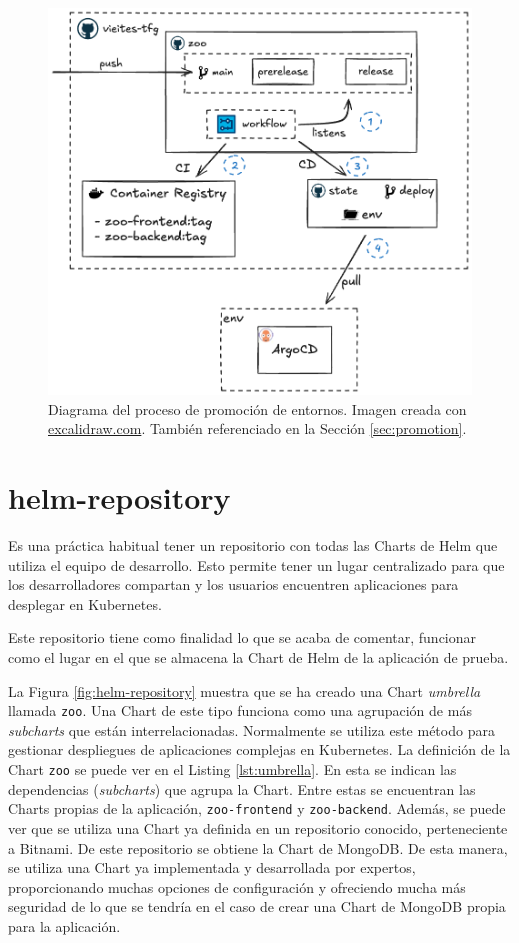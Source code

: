 \begin{figure}[h]
  \centerline{\includegraphics[width=13cm]{figuras/promotion}}
  \caption{Diagrama del proceso de promoción de entornos. Imagen creada con \href{https://excalidraw.com}{excalidraw.com}. También referenciado en la Sección \ref{sec:promotion}.}
  \label{fig:promotion}
\end{figure}


\section{helm-repository}
\label{subsec:helm}

Es una práctica habitual tener un repositorio con todas las Charts de Helm que utiliza el equipo de desarrollo. Esto permite tener un lugar centralizado para que los desarrolladores compartan y los usuarios encuentren aplicaciones para desplegar en Kubernetes.

Este repositorio tiene como finalidad lo que se acaba de comentar, funcionar como el lugar en el que se almacena la Chart de Helm de la aplicación de prueba.

La Figura \ref{fig:helm-repository} muestra que se ha creado una Chart \textit{umbrella} llamada \texttt{zoo}. Una Chart de este tipo funciona como una agrupación de más \textit{subcharts} que están interrelacionadas. Normalmente se utiliza este método para gestionar despliegues de aplicaciones complejas en Kubernetes.
La definición de la Chart \texttt{zoo} se puede ver en el Listing \ref{lst:umbrella}. En esta se indican las dependencias (\textit{subcharts}) que agrupa la Chart. Entre estas se encuentran las Charts propias de la aplicación, \texttt{zoo-frontend} y \texttt{zoo-backend}. Además, se puede ver que se utiliza una Chart ya definida en un repositorio conocido, perteneciente a Bitnami\cite{bitnami}. De este repositorio se obtiene la Chart de MongoDB. De esta manera, se utiliza una Chart ya implementada y desarrollada por expertos, proporcionando muchas opciones de configuración y ofreciendo mucha más seguridad de lo que se tendría en el caso de crear una Chart de MongoDB propia para la aplicación.

